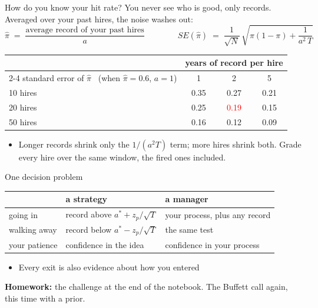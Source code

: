 \documentclass[aspectratio=169,10pt]{beamer}
\begin{document}
\begin{frame}{How do you know your hit rate?}
You never see who is good, only records. Averaged over your past hires, the noise washes out:
\[ \hat{\pi} \;=\; \frac{\text{average record of your past hires}}{a}
   \qquad\qquad
   SE(\hat{\pi}) \;=\; \frac{1}{\sqrt{N}}\,\sqrt{\pi(1-\pi) + \frac{1}{a^{2}\,T}} \]
\begin{center}
\renewcommand{\arraystretch}{1.2}
\begin{tabular}{lccc}
\toprule
 & \multicolumn{3}{c}{years of record per hire} \\
\cmidrule(lr){2-4}
standard error of $\hat{\pi}$ \ (when $\hat{\pi} = 0.6$, $a = 1$) & 1 & 2 & 5 \\
\midrule
10 hires & 0.35 & 0.27 & 0.21 \\
20 hires & 0.25 & \textcolor{red}{0.19} & 0.15 \\
50 hires & 0.16 & 0.12 & 0.09 \\
\bottomrule
\end{tabular}
\end{center}
\begin{itemize}
\item Longer records shrink only the $1/(a^{2}T)$ term; more hires shrink both. Grade every hire over the same window, the fired ones included.
\end{itemize}
\end{frame}

\begin{frame}{One decision problem}
\begin{center}
\renewcommand{\arraystretch}{1.6}
\begin{tabular}{lll}
\toprule
 & a strategy & a manager \\
\midrule
going in & record above $a^{*} + z_p/\sqrt{T}$ & your process, plus any record \\
walking away & record below $a^{*} - z_p/\sqrt{T}$ & the same test \\
your patience & confidence in the idea & confidence in your process \\
\bottomrule
\end{tabular}
\end{center}
\vskip 10pt
\begin{itemize}
\item Every exit is also evidence about how you entered
\end{itemize}
\vskip 14pt
{\small \textbf{Homework:} the challenge at the end of the notebook. The Buffett call again, this time with a prior.}
\end{frame}
\end{document}
